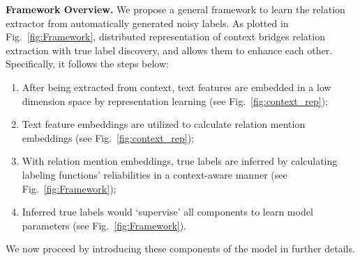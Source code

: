 \smallskip
\noindent
\textsf{\textbf{\small Framework Overview. }}
We propose a general framework to learn the relation extractor from automatically generated noisy labels. 
As plotted in Fig.~\ref{fig:Framework}, distributed representation of context bridges relation extraction with true label discovery, and allows them to enhance each other.
Specifically, it follows the steps below:
\begin{enumerate}[fullwidth,itemindent=0em,label=\arabic*.]\setlength{\itemsep}{-0.05cm}
\item
After being extracted from context, text features are embedded in a low dimension space by representation learning (see Fig.~\ref{fig:context_rep});

\item
Text feature embeddings are utilized to calculate relation mention embeddings (see Fig.~\ref{fig:context_rep});

\item
With relation mention embeddings, true labels are inferred by calculating labeling functions' reliabilities in a context-aware manner (see Fig.~\ref{fig:Framework});

\item
Inferred true labels would `supervise' all components to learn model parameters (see Fig.~\ref{fig:Framework}).
\end{enumerate}
We now proceed by introducing these components of the model in further details. 


